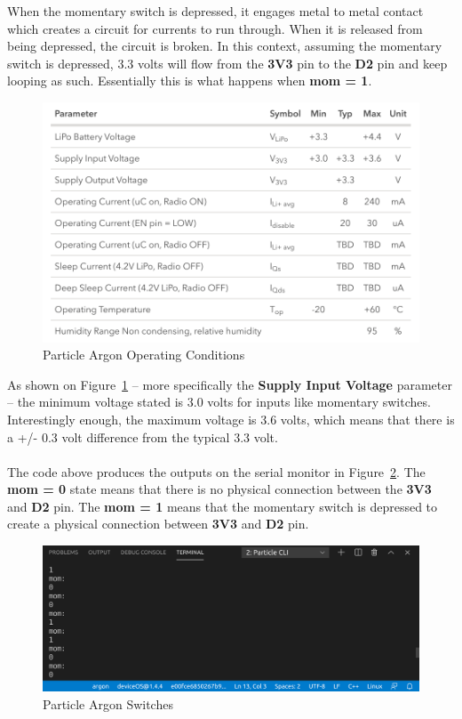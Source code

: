 \documentclass{article}
\begin{document}
When the momentary switch is depressed, it engages metal to metal contact which creates a circuit for currents to run through. When it is released from being depressed, the circuit is broken. In this context, assuming the momentary switch is depressed, 3.3 volts will flow from the \textbf{3V3} pin to the \textbf{D2} pin and keep looping as such. Essentially this is what happens when \textbf{mom = 1}.\\

\begin{figure}[H]
\center
\includegraphics[width=\textwidth]{images/operating-conditions.png}
\caption{Particle Argon Operating Conditions}
\label{fig:operating}
\end{figure}

As shown on Figure~\ref{fig:operating} -- more specifically the \textbf{Supply Input Voltage} parameter -- the minimum voltage stated is 3.0 volts for inputs like momentary switches. Interestingly enough, the maximum voltage is 3.6 volts, which means that there is a +/- 0.3 volt difference from the typical 3.3 volt.\\

\ \\

The code above produces the outputs on the serial monitor in Figure~\ref{fig:mom}. The \textbf{mom = 0} state means that there is no physical connection between the \textbf{3V3} and \textbf{D2} pin. The \textbf{mom = 1} means that the momentary switch is depressed to create a physical connection between \textbf{3V3} and \textbf{D2} pin.

\begin{figure}[H]
\center
\includegraphics[width=\textwidth]{images/mom.png}
\caption{Particle Argon Switches}
\label{fig:mom}
\end{figure}
\end{document}
